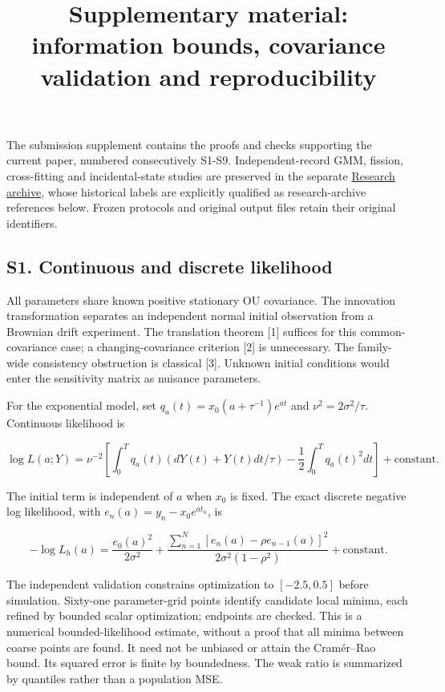 \documentclass[
  american,
  11pt,
]{article}
\title{Supplementary material: information bounds, covariance validation
and reproducibility}
\author{}
\date{}
\begin{document}
\maketitle

The submission supplement contains the proofs and checks supporting the
current paper, numbered consecutively S1-S9. Independent-record GMM,
fission, cross-fitting and incidental-state studies are preserved in the
separate \href{research_extensions_archive.pdf}{Research archive}, whose
historical labels are explicitly qualified as research-archive
references below. Frozen protocols and original output files retain
their original identifiers.

\subsection{S1. Continuous and discrete
likelihood}\label{s1.-continuous-and-discrete-likelihood}

All parameters share known positive stationary OU covariance. The
innovation transformation separates an independent normal initial
observation from a Brownian drift experiment. The translation theorem
{[}1{]} suffices for this common-covariance case; a changing-covariance
criterion {[}2{]} is unnecessary. The family-wide consistency
obstruction is classical {[}3{]}. Unknown initial conditions would enter
the sensitivity matrix as nuisance parameters.

For the exponential model, set \(q_a(t)=x_0(a+\tau^{-1})e^{at}\) and
\(\nu^2=2\sigma^2/\tau\). Continuous likelihood is

\[
\log L(a;Y)=\nu^{-2}\left[\int_0^Tq_a(t)(dY(t)+Y(t)dt/\tau)-\frac12\int_0^Tq_a(t)^2dt\right]+\text{constant}.
\]

The initial term is independent of \(a\) when \(x_0\) is fixed. The
exact discrete negative log likelihood, with \(e_n(a)=y_n-x_0e^{at_n}\),
is

\[
-\log L_h(a)=\frac{e_0(a)^2}{2\sigma^2}+
\frac{\sum_{n=1}^N[e_n(a)-\rho e_{n-1}(a)]^2}{2\sigma^2(1-\rho^2)}+\text{constant}.
\]

The independent validation constrains optimization to \([-2.5,0.5]\)
before simulation. Sixty-one parameter-grid points identify candidate
local minima, each refined by bounded scalar optimization; endpoints are
checked. This is a numerical bounded-likelihood estimate, without a
proof that all minima between coarse points are found. It need not be
unbiased or attain the Cramér--Rao bound. Its squared error is finite by
boundedness. The weak ratio is summarized by quantiles rather than a
population MSE.
\end{document}
